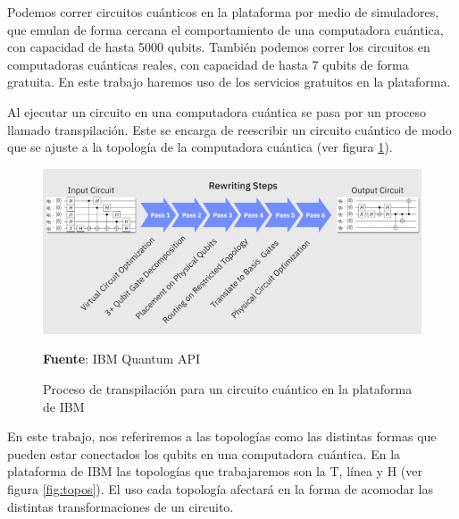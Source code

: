 \documentclass[letterpaper,12pt]{thesisECFM}
\theoremstyle{plain}
\theoremstyle{definition}
\theoremstyle{definition}
\theoremstyle{remark}
\newcommand{\1}{\mathbb{1}}
\begin{document}
 Podemos correr circuitos cuánticos en la plataforma por medio de simuladores, que emulan de forma cercana el comportamiento de una computadora cuántica, con capacidad de hasta 5000 qubits. También podemos correr los circuitos en computadoras cuánticas reales,  con capacidad de hasta 7 qubits de forma gratuita. En este trabajo haremos uso de los servicios gratuitos en la plataforma. 
 
Al ejecutar un circuito en una computadora cuántica se pasa por un proceso llamado transpilación. Este se encarga de reescribir un circuito cuántico de modo que se ajuste a la topología de la computadora cuántica (ver figura \ref{fig:transpiling}). 
\begin{figure}[h]
    \centering
    \includegraphics[scale=0.15]{imagenes/transpiling_core_steps.png}
    \caption{Proceso de transpilación para un circuito cuántico en la plataforma de IBM} \textbf{Fuente}: IBM Quantum API \cite{ibm_quantum_api}
    \label{fig:transpiling}
\end{figure}

En este trabajo, nos referiremos a las topologías como las distintas formas que pueden estar conectados los qubits en una computadora cuántica. En la plataforma de IBM las topologías que trabajaremos son la T, línea y H (ver figura \ref{fig:topos}). El uso cada topología afectará en la forma de acomodar las distintas transformaciones de un circuito.  
\end{document}
